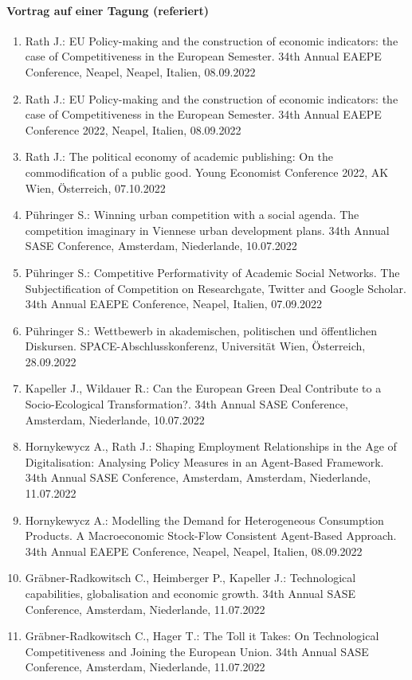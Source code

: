    \paragraph{Vortrag auf einer Tagung (referiert)}
\begin{enumerate}
	\item Rath J.: EU Policy-making and the construction of economic indicators: the case of Competitiveness in the European Semester. 34th Annual EAEPE Conference, Neapel, Neapel, Italien, 08.09.2022
	\item Rath J.: EU Policy-making and the construction of economic indicators: the case of Competitiveness in the European Semester. 34th Annual EAEPE Conference 2022, Neapel, Italien, 08.09.2022
	\item Rath J.: The political economy of academic publishing: On the commodification of a public good. Young Economist Conference 2022, AK Wien, Österreich, 07.10.2022
	\item Pühringer S.: Winning urban competition with a social agenda. The competition imaginary in Viennese urban development plans. 34th Annual SASE Conference, Amsterdam, Niederlande, 10.07.2022
	\item Pühringer S.: Competitive Performativity of Academic Social Networks. The Subjectification of Competition on Researchgate, Twitter and Google Scholar. 34th Annual EAEPE Conference, Neapel, Italien, 07.09.2022
	\item Pühringer S.: Wettbewerb in akademischen, politischen und öffentlichen Diskursen. SPACE-Abschlusskonferenz,  Universität Wien, Österreich, 28.09.2022
	\item Kapeller J., Wildauer R.: Can the European Green Deal Contribute to a Socio-Ecological Transformation?. 34th Annual SASE Conference, Amsterdam, Niederlande, 10.07.2022
	\item Hornykewycz A., Rath J.: Shaping Employment Relationships in the Age of Digitalisation: Analysing Policy Measures in an Agent-Based Framework. 34th Annual SASE Conference, Amsterdam, Amsterdam, Niederlande, 11.07.2022
	\item Hornykewycz A.: Modelling the Demand for Heterogeneous Consumption Products. A Macroeconomic Stock-Flow Consistent Agent-Based Approach. 34th Annual EAEPE Conference, Neapel, Neapel, Italien, 08.09.2022
	\item Gräbner-Radkowitsch C., Heimberger P., Kapeller J.: Technological capabilities, globalisation and economic growth. 34th Annual SASE Conference, Amsterdam, Niederlande, 11.07.2022
	\item Gräbner-Radkowitsch C., Hager T.: The Toll it Takes: On Technological Competitiveness and Joining the European Union. 34th Annual SASE Conference, Amsterdam, Niederlande, 11.07.2022

\end{enumerate}
